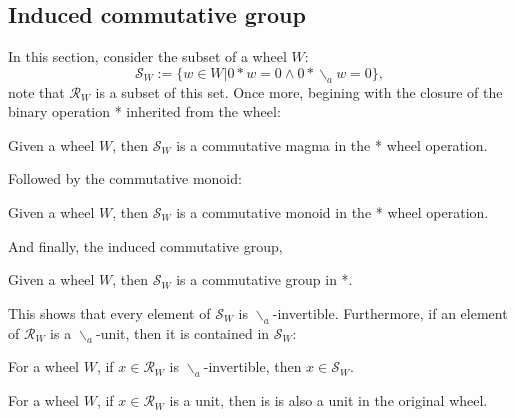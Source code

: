 \subsection{Induced commutative group}
In this section, consider the subset of a wheel $W$:
\[
  \mathcal{S}_{W} := \{ w \in W | 0*w = 0 \wedge 0*\backslash_{a}w = 0 \},
\]
note that $\mathcal{R}_{W}$ is a subset of this set. Once more, begining with the closure of the binary operation *
inherited from the wheel:
\begin{definition}
  \label{def:S_w_magma}
  \leanok
  Given a wheel $W$, then $\mathcal{S}_{W}$ is a commutative magma in the * wheel operation.
\end{definition}
Followed by the commutative monoid:
\begin{definition}
  \label{def:S_w_monoid}
  \leanok
  Given a wheel $W$, then $\mathcal{S}_{W}$ is a commutative monoid in the * wheel operation.
\end{definition}
And finally, the induced commutative group,
\begin{definition}
  \label{def:S_w_group}
  \leanok
  Given a wheel $W$, then $\mathcal{S}_{W}$ is a commutative group in *.
\end{definition}
This shows that every element of $\mathcal{S}_{W}$ is $\backslash_{a}$-invertible. Furthermore, if an element of $\mathcal{R}_{W}$ 
is a $\backslash_{a}$-unit, then it is contained in $\mathcal{S}_{W}$:
\begin{proposition}
  \label{prop:S_w_of_wheel_invertible_R_w}
  \leanok
  For a wheel $W$, if $x \in \mathcal{R}_{W}$ is $\backslash_{a}$-invertible, then $x \in \mathcal{S}_{W}$.
\end{proposition}
\begin{proposition}
  \label{prop:wheel_unit_of_R_w_unit}
  \leanok
  For a wheel $W$, if $x \in \mathcal{R}_{W}$ is a unit, then is is also a unit in the original wheel.
\end{proposition}
